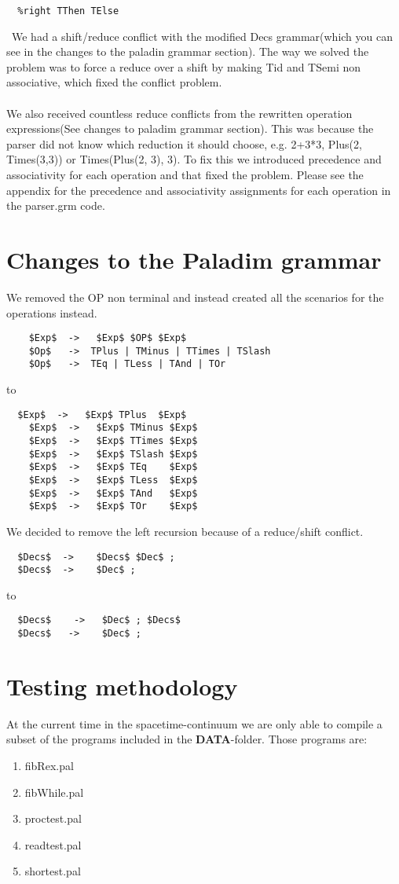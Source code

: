 \documentclass[12pt,a4paper]{article}
\begin{document}
\begin{verbatim}
  %right TThen TElse 
\end{verbatim}
\
We had a shift/reduce conflict with the modified Decs grammar(which you can see in the changes to the paladin grammar section). The
way we solved the problem was to force a reduce over a shift by making Tid and TSemi non associative, which fixed the conflict problem.
\\
\\
We also received countless reduce conflicts from the rewritten operation expressions(See changes to paladim grammar section).
This was because the parser did not know which reduction it should choose, e.g. 2+3*3, Plus(2, Times(3,3)) or Times(Plus(2, 3), 3). To fix
this we introduced precedence and associativity for each operation and that fixed the problem. Please see the appendix for the precedence
and associativity assignments for each operation in the parser.grm code.
\section{Changes to the Paladim grammar}
We removed the OP non terminal and instead created all the scenarios for the operations instead.
\begin{lstlisting}
	$Exp$  ->   $Exp$ $OP$ $Exp$ 
	$Op$   ->  TPlus | TMinus | TTimes | TSlash 
	$Op$   ->  TEq | TLess | TAnd | TOr
\end{lstlisting}
to
\begin{lstlisting}
  $Exp$  ->   $Exp$ TPlus  $Exp$
	$Exp$  ->   $Exp$ TMinus $Exp$
	$Exp$  ->   $Exp$ TTimes $Exp$
	$Exp$  ->   $Exp$ TSlash $Exp$
	$Exp$  ->   $Exp$ TEq    $Exp$
	$Exp$  ->   $Exp$ TLess  $Exp$
	$Exp$  ->   $Exp$ TAnd   $Exp$
	$Exp$  ->   $Exp$ TOr    $Exp$ 
\end{lstlisting}
We decided to remove the left recursion because of a reduce/shift conflict.
\begin{lstlisting}
  $Decs$  ->    $Decs$ $Dec$ ; 
  $Decs$  ->    $Dec$ ;
\end{lstlisting}
to
\begin{lstlisting}
  $Decs$    ->   $Dec$ ; $Decs$
  $Decs$   ->    $Dec$ ;
\end{lstlisting}
\section{Testing methodology}
At the current time in the spacetime-continuum we are only able to compile a subset
of the programs included in the \textbf{DATA}-folder. Those programs are:\\
\begin{enumerate}
  \item fibRex.pal
  \item fibWhile.pal
  \item proctest.pal
  \item readtest.pal
  \item shortest.pal
\end{enumerate}
\end{document}
